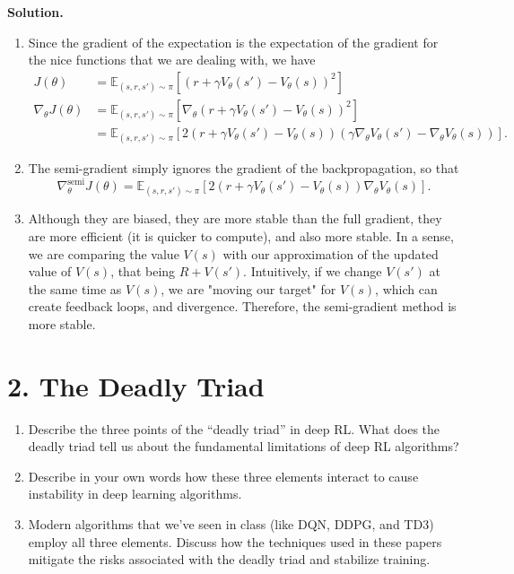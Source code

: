 \documentclass[11pt]{article}
\begin{document}
\textbf{Solution.}

\begin{enumerate}
    \item[(a)] Since the gradient of the expectation is the expectation of the gradient for the nice functions that we are dealing with, we have
        \begin{align*}
            J(\theta) &= \mathbb{E}_{(s, r, s') \sim \pi } [(r + \gamma V_{\theta}(s') - V_{\theta}(s))^2]\\
            \nabla_{\theta} J(\theta) &= \mathbb{E}_{(s, r, s') \sim  \pi} [\nabla_{\theta} (r + \gamma V_{\theta}(s') - V_{\theta}(s))^2] \\
            &= \mathbb{E}_{(s, r, s') \sim  \pi} [2(r + \gamma V_{\theta}(s') - V_{\theta}(s))(\gamma \nabla_{\theta}V_{\theta}(s') - \nabla_{\theta} V_{\theta}(s))]
        .\end{align*}
    \item[(b)]
        The semi-gradient simply ignores the gradient of the backpropagation, so that
        \[
        \nabla_{\theta}^{\text{semi}} J(\theta) = \mathbb{E}_{(s, r, s') \sim \pi} [ 2(r + \gamma V_{\theta}(s') - V_{\theta}(s))\nabla_{\theta} V_{\theta}(s)]
        .\] 
    \item[(c)] Although they are biased, they are more stable than the full gradient, they are more efficient (it is quicker to compute), and also more stable. In a sense, we are comparing the value $V(s)$ with our approximation of the updated value of $V(s)$, that being $R + V(s')$.
        Intuitively, if we change $V(s')$ at the same time as $V(s)$, we are "moving our target" for $V(s)$, which can create feedback loops, and divergence.
        Therefore, the semi-gradient method is more stable.
\end{enumerate}

\section*{2. The Deadly Triad}
\begin{enumerate}
    \item[(a)] Describe the three points of the ``deadly triad'' in deep RL. What does the deadly triad tell us about the fundamental limitations of deep RL algorithms?
    \item[(b)] Describe in your own words how these three elements interact to cause instability in deep learning algorithms.
    \item[(c)] Modern algorithms that we’ve seen in class (like DQN, DDPG, and TD3) employ all three elements. Discuss how the techniques used in these papers mitigate the risks associated with the deadly triad and stabilize training.
\end{enumerate}
\end{document}
